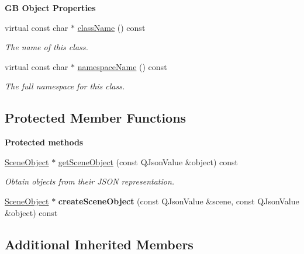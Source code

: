 \begin{Indent}\textbf{ GB Object Properties}\par
\begin{DoxyCompactItemize}
\item 
virtual const char $\ast$ \mbox{\hyperlink{classrev_1_1_scene_command_a9b9126f306b1775c4f74ffb8b1a49dc5}{class\+Name}} () const
\begin{DoxyCompactList}\small\item\em The name of this class. \end{DoxyCompactList}\item 
virtual const char $\ast$ \mbox{\hyperlink{classrev_1_1_scene_command_a8914ef927fc5bcf9071ab857c4c636a4}{namespace\+Name}} () const
\begin{DoxyCompactList}\small\item\em The full namespace for this class. \end{DoxyCompactList}\end{DoxyCompactItemize}
\end{Indent}
\subsection*{Protected Member Functions}
\begin{Indent}\textbf{ Protected methods}\par
\begin{DoxyCompactItemize}
\item 
\mbox{\label{classrev_1_1_scene_command_ad2cc56c38710fc11ffc3493f5fda46f9}} 
\mbox{\hyperlink{classrev_1_1_scene_object}{Scene\+Object}} $\ast$ \mbox{\hyperlink{classrev_1_1_scene_command_ad2cc56c38710fc11ffc3493f5fda46f9}{get\+Scene\+Object}} (const Q\+Json\+Value \&object) const
\begin{DoxyCompactList}\small\item\em Obtain objects from their J\+S\+ON representation. \end{DoxyCompactList}\item 
\mbox{\label{classrev_1_1_scene_command_a6061e5347c9cbfe141660de95bbe67b1}} 
\mbox{\hyperlink{classrev_1_1_scene_object}{Scene\+Object}} $\ast$ {\bfseries create\+Scene\+Object} (const Q\+Json\+Value \&scene, const Q\+Json\+Value \&object) const
\end{DoxyCompactItemize}
\end{Indent}
\subsection*{Additional Inherited Members}


